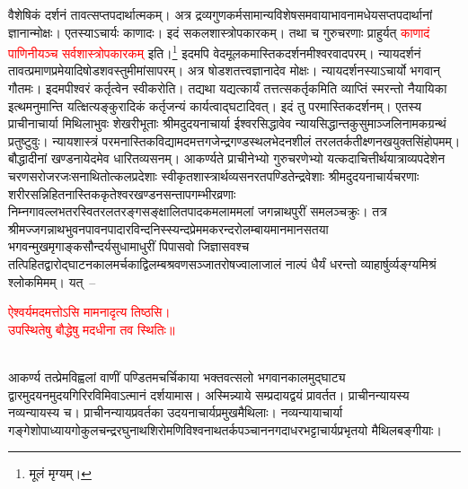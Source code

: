 \begin{sloppypar}\justifying\noindent\hspace{10mm} वैशेषिकं दर्शनं तावत्सप्त\-पदार्थात्मकम्। अत्र द्रव्य\-गुण\-कर्म\-सामान्य\-विशेष\-समवायाभाव\-नामधेय\-सप्त\-पदार्थानां ज्ञानान्मोक्षः। एतस्याऽचार्यः काणादः। इदं सकल\-शास्त्रोपकारकम्। तथा च गुरु\-चरणाः प्राहुर्यत् \textcolor{red}{काणादं पाणिनीयञ्च सर्वशास्त्रोपकारकम्} इति।\footnote{मूलं मृग्यम्।} इदमपि वेद\-मूलकमास्तिक\-दर्शनमीश्वर\-वाद\-परम्। न्याय\-दर्शनं तावत्प्रमाण\-प्रमेयादि\-षोडश\-वस्तु\-मीमांसापरम्। अत्र षोडश\-तत्त्व\-ज्ञानादेव मोक्षः। न्यायदर्शनस्याऽचार्यो भगवान् गौतमः। इदमपीश्वरं कर्तृत्वेन स्वीकरोति। तद्यथा यद्यत्कार्यं तत्तत्सकर्तृकमिति व्याप्तिं स्मरन्तो नैयायिका इत्थमनुमान्ति यत्क्षित्यङ्कुरादिकं कर्तृजन्यं कार्यत्वाद्घटादिवत्। इदं तु परमास्तिक\-दर्शनम्। एतस्य प्राचीनाचार्या मिथिला\-भुवः शेखरीभूताः श्रीमदुदयनाचार्या ईश्वर\-सिद्धावेव न्याय\-सिद्धान्त\-कुसुमाञ्जलि\-नामक\-ग्रन्थं प्रतुष्टुवुः। न्याय\-शास्त्रं परम\-नास्तिक\-विद्या\-मद\-मत्त\-गजेन्द्र\-गण्ड\-स्थल\-भेदन\-शीलं तरल\-तर्क\-तीक्ष्ण\-नख\-युक्त\-सिंहोपमम्। बौद्धादीनां खण्डनायेदमेव धारित\-व्यसनम्। आकर्ण्यते प्राचीनेभ्यो गुरुचरणेभ्यो यत्कदाचित्तीर्थ\-यात्रा\-व्यपदेशेन चरण\-सरोज\-रजः\-सनाथितोत्कल\-प्रदेशाः स्वीकृत\-शास्त्रार्थ\-व्यसन\-रत\-पण्डितेन्द्र\-वेशाः श्रीमदुदयनाचार्य\-चरणाः शरीर\-सन्निहित\-नास्तिक\-कृतेश्वर\-खण्डन\-सन्ताप\-गम्भीर\-व्रणाः निम्नगा\-वल्लभ\-तरस्वि\-तरल\-तरङ्ग\-सङ्क्षालित\-पाद\-कमलाममलां जगन्नाथपुरीं समलञ्चक्रुः। तत्र 
श्रीमज्जगन्नाथ\-भुवन\-पावन\-पादारविन्द\-निस्स्यन्द\-प्रेम\-मकरन्द\-रोलम्बायमान\-मानसतया
भगवन्मुख\-मृगाङ्क\-सौन्दर्य\-सुधा\-माधुरीं पिपासवो जिज्ञासवश्च तत्पिहित\-द्वारोद्घाटन\-कालमर्चकाद्विलम्ब\-श्रवण\-सञ्जात\-रोष\-ज्वाला\-जालं नाल्पं धैर्यं धरन्तो व्याहार्षुर्व्यङ्ग्य\-मिश्रं श्लोकमिमम्। यत्~–\end{sloppypar}
\centering\textcolor{red}{ऐश्वर्यमदमत्तोऽसि मामनादृत्य तिष्ठसि।\nopagebreak\\
उपस्थितेषु बौद्धेषु मदधीना तव स्थितिः॥}\nopagebreak\\
\\
\begin{sloppypar}\justifying\noindent\hspace{10mm} आकर्ण्य तत्प्रेम\-विह्वलां वाणीं पण्डित\-मचर्चिकाया भक्त\-वत्सलो भगवानकालमुद्घाट्य द्वारमुदयनमुदय\-गिरि\-रविमिवाऽत्मानं दर्शयामास। अस्मिन्न्याये सम्प्रदाय\-द्वयं प्रावर्तत। प्राचीन\-न्यायस्य नव्य\-न्यायस्य च। प्राचीन\-न्याय\-प्रवर्तका उदयनाचार्य\-प्रमुख\-मैथिलाः। नव्य\-न्यायाचार्या गङ्गेशोपाध्याय\-गोकुलचन्द्र\-रघुनाथशिरोमणि\-विश्वनाथ\-तर्कपञ्चानन\-गदाधर\-भट्टाचार्य\-प्रभृतयो मैथिलबङ्गीयाः।\end{sloppypar}
